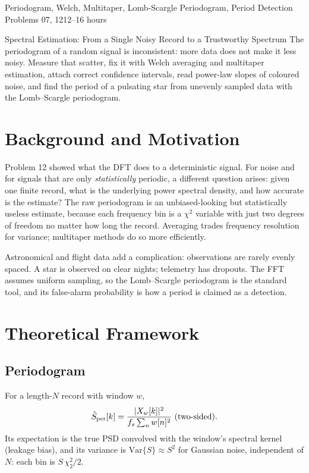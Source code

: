 \documentclass[11pt,a4paper]{article}
\begin{document}
%
{Periodogram, Welch, Multitaper, Lomb-Scargle Periodogram, Period Detection}%
{Problems 07, 12}{12--16 hours}

\begin{summarybox}{Spectral Estimation: From a Single Noisy Record to a Trustworthy Spectrum}
The periodogram of a random signal is inconsistent: more data does not make it less noisy. Measure that scatter, fix it with Welch averaging and multitaper estimation, attach correct confidence intervals, read power-law slopes of coloured noise, and find the period of a pulsating star from unevenly sampled data with the Lomb--Scargle periodogram.
\end{summarybox}


\section*{Background and Motivation}
Problem 12 showed what the DFT does to a deterministic signal. For noise and for signals that are only \emph{statistically} periodic, a different question arises: given one finite record, what is the underlying power spectral density, and how accurate is the estimate? The raw periodogram is an unbiased-looking but statistically useless estimate, because each frequency bin is a $\chi^2$ variable with just two degrees of freedom no matter how long the record. Averaging trades frequency resolution for variance; multitaper methods do so more efficiently.

Astronomical and flight data add a complication: observations are rarely evenly spaced. A star is observed on clear nights; telemetry has dropouts. The FFT assumes uniform sampling, so the Lomb--Scargle periodogram is the standard tool, and its false-alarm probability is how a period is claimed as a detection.

\section*{Theoretical Framework}
\subsection{Periodogram}
For a length-$N$ record with window $w$,
\begin{equation}
  \hat S_{\rm per}[k]=\frac{|X_w[k]|^2}{f_s\sum_nw[n]^2}\ (\text{two-sided}).
  \label{eq:per}
\end{equation}
Its expectation is the true PSD convolved with the window's spectral kernel (leakage bias), and its variance is $\mathrm{Var}\{\hat S\}\approx S^2$ for Gaussian noise, independent of $N$: each bin is $S\,\chi^2_2/2$.
\end{document}
